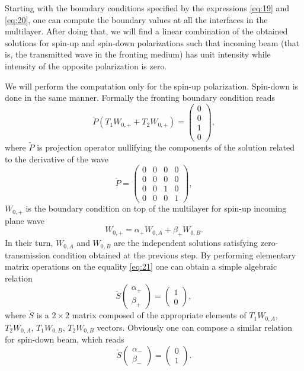\documentclass[12pt,a4paper]{article}
\begin{document}
Starting with the boundary conditions specified by the expressions \ref{eq:19} and \ref{eq:20}, one can compute the boundary values at all the interfaces in the multilayer. After doing that, we will find a linear combination of the obtained solutions for spin-up and spin-down polarizations such that incoming beam (that is, the transmitted wave in the fronting medium) has unit intensity while intensity of the opposite polarization is zero.

We will perform the computation only for the spin-up polarization. Spin-down is done in the same manner. Formally the fronting boundary condition reads
\begin{equation} \label{eq:21}
\check{P} \left( T_1 W_{0,+} + T_2 W_{0, +} \right)
=
\left(
\begin{matrix}
0 \\ 0 \\ 1 \\ 0
\end{matrix}
\right),
\end{equation}
where $\check{P}$ is projection operator nullifying the components of the solution related to the derivative of the wave
\begin{equation}
\check{P}
=
\left(
\begin{matrix}
0	&	0	&	0	&	0 \\
0	&	0	&	0	&	0 \\
0	&	0	&	1	&	0 \\
0	&	0	&	0	&	1
\end{matrix}
\right),
\end{equation}
$W_{0, +}$ is the boundary condition on top of the multilayer for spin-up incoming plane wave
\begin{equation}
W_{0, +} = \alpha_{+} W_{0, A} + \beta_{+} W_{0, B}.
\end{equation}
In their turn, $W_{0, A}$ and $W_{0, B}$ are the independent solutions satisfying zero-transmission condition obtained at the previous step.
By performing elementary matrix operations on the equality \ref{eq:21} one can obtain a simple algebraic relation
\begin{equation}
\check{S}
\left(
\begin{matrix}
\alpha_{+} \\
\beta_{+}
\end{matrix}
\right)
=
\left(
\begin{matrix}
1 \\
0
\end{matrix}
\right),
\end{equation}
where $\check{S}$ is a $2 \times 2$ matrix composed of the appropriate elements of $T_1 W_{0,A}$, $T_2 W_{0,A}$, $T_1 W_{0,B}$, $T_2 W_{0,B}$ vectors. Obviously one can compose a similar relation for spin-down beam, which reads
\begin{equation}
\check{S}
\left(
\begin{matrix}
\alpha_{-} \\
\beta_{-}
\end{matrix}
\right)
=
\left(
\begin{matrix}
0 \\
1
\end{matrix}
\right).
\end{equation}
\end{document}
